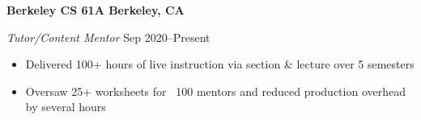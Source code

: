 \textbf{Berkeley CS 61A \hfill Berkeley, CA} \par
\textit{Tutor/Content Mentor} \hfill Sep 2020--Present \par
\begin{itemize}
	\item Delivered 100+ hours of live instruction via section \& lecture over 5 semesters
	\item Oversaw 25+ worksheets for ~100 mentors and reduced production overhead by several hours
\end{itemize}\par
